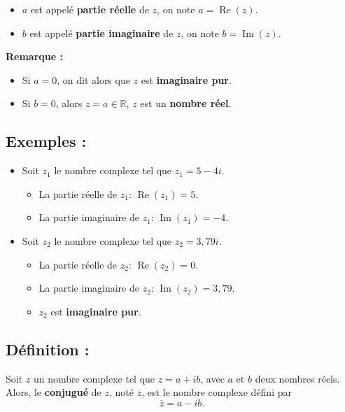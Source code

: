 \documentclass[a4paper,12pt]{article}
\begin{document}
    \begin{itemize}
        \item $a$ est appelé \textbf{partie réelle} de $z$, on note $a = \operatorname{Re}(z)$.
        \item $b$ est appelé \textbf{partie imaginaire} de $z$, on note $b = \operatorname{Im}(z)$.
    \end{itemize}

    \textbf{Remarque :}
    \begin{itemize}
        \item Si $a = 0$, on dit alors que $z$ est \textbf{imaginaire pur}.
        \item Si $b = 0$, alors $z = a \in \mathbb{R}$, $z$ est un \textbf{nombre réel}.
    \end{itemize}

    \subsection{Exemples :}

    \begin{itemize}
        \item Soit $z_1$ le nombre complexe tel que $z_1 = 5 - 4i$.
        \begin{itemize}
            \item La partie réelle de $z_1$: $\operatorname{Re}(z_1) = 5$.
            \item La partie imaginaire de $z_1$: $\operatorname{Im}(z_1) = -4$.
        \end{itemize}

        \item Soit $z_2$ le nombre complexe tel que $z_2 = 3,79i$.
        \begin{itemize}
            \item La partie réelle de $z_2$: $\operatorname{Re}(z_2) = 0$.
            \item La partie imaginaire de $z_2$: $\operatorname{Im}(z_2) = 3,79$.
            \item $z_2$ est \textbf{imaginaire pur}.
        \end{itemize}
    \end{itemize}

    \subsection{Définition :}
    Soit $z$ un nombre complexe tel que $z = a + ib$, avec $a$ et $b$ deux nombres réels. Alors, le \textbf{conjugué} de $z$, noté $\overline{z}$, est le nombre complexe défini par
    \[
        \overline{z} = a - ib.
    \]
\end{document}
